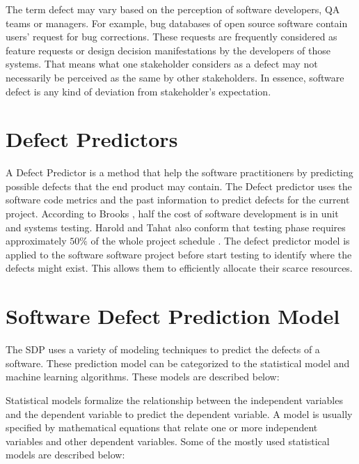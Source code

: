 \documentclass[12pt]{report}
\begin{document}
The term defect may vary based on the perception of software developers, QA teams or managers. For example, bug databases of open source software contain users' request for bug corrections. These requests are frequently considered as feature requests or design decision manifestations by the developers of those systems. That means what one stakeholder considers as a defect may not necessarily be perceived as the same by other stakeholders. In essence, software defect is any kind of deviation from stakeholder's expectation.

\section{Defect Predictors}
\label{defination_defect_Predictors}
A Defect Predictor is a method that help the software practitioners by predicting possible defects that the end product may contain. The Defect predictor uses the software code metrics and the past information to predict defects for the current project. According to Brooks \cite{brooks1995mythical}, half the cost of software development is in unit and systems testing. Harold and Tahat also conform that testing phase requires approximately $50\%$ of the whole project schedule \cite{harrold2000testing,tahat2001requirement}. The defect predictor model is applied to the software software project before start testing to identify where the defects might exist. This allows them to efficiently allocate their scarce resources. 

\section{Software Defect Prediction Model}
The SDP uses a variety of modeling techniques to predict the defects of a software. These prediction model can be categorized to the statistical model and machine learning algorithms. These models are described below:

Statistical models formalize the relationship between the independent variables and the dependent variable to predict the dependent variable. A model is usually specified by mathematical equations that relate one or more independent variables and other dependent variables. Some of the mostly used statistical models are described below:
\end{document}
